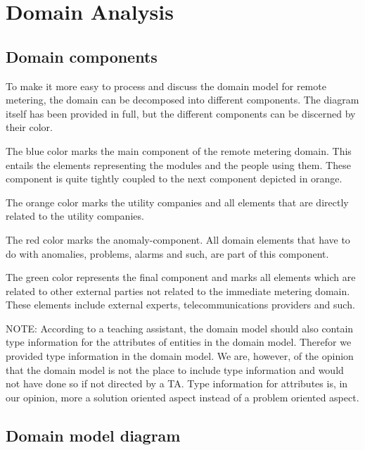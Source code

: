 \section{Domain Analysis}
\subsection{Domain components}
To make it more easy to process and discuss the domain model for remote metering, the domain can be decomposed
into different components. The diagram itself has been provided in full, but the different components
can be discerned by their color. 

The blue color marks the main component of the remote metering domain. This entails the elements representing the modules 
and the people using them. These component is quite tightly coupled to the next component depicted in orange.

The orange color marks the utility companies and all elements that are directly related to the utility companies.

The red color marks the anomaly-component. All domain elements that have to do with anomalies, problems, alarms and such, 
are part of this component.

The green color represents the final component and marks all elements which are related to other external parties 
not related to the immediate metering domain. These elements include external experts, telecommunications providers and such. 

NOTE: According to a teaching assistant, the domain model should also contain type information for the attributes of entities in the domain model.
 Therefor we provided type information in the domain model. We are, however, of the opinion that the domain model is not the place to include type information and would not have done so if not directed by a TA. 
Type information for attributes is, in our opinion, more a solution oriented aspect instead of a problem oriented aspect.
\subsection{Domain model diagram}
